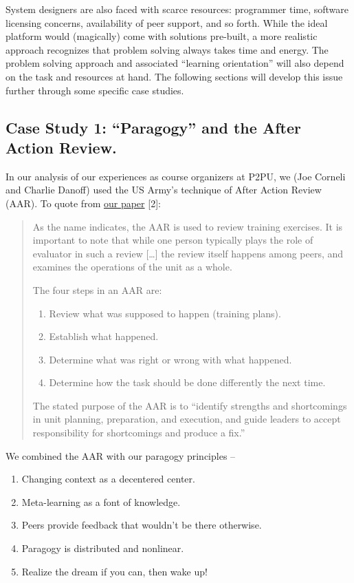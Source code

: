 System designers are also faced with scarce resources: programmer time,
software licensing concerns, availability of peer support, and so forth.
While the ideal platform would (magically) come with solutions
pre-built, a more realistic approach recognizes that problem solving
always takes time and energy. The problem solving approach and
associated ``learning orientation'' will also depend on the task and
resources at hand. The following sections will develop this issue
further through some specific case studies.

\subsection{Case Study 1: ``Paragogy'' and the After Action
Review.}\label{case-study-1-paragogy-and-the-after-action-review.}

In our analysis of our experiences as course organizers at P2PU, we (Joe
Corneli and Charlie Danoff) used the US Army's technique of After Action
Review (AAR). To quote from
\href{http://paragogy.net/ParagogyPaper2}{our paper} {{[}2{]}}:

\begin{quote}
As the name indicates, the AAR is used to review training exercises. It
is important to note that while one person typically plays the role of
evaluator in such a review {{[}\ldots{}{]}} the review itself happens
among peers, and examines the operations of the unit as a whole.

The four steps in an AAR are:

\begin{enumerate}
\def\labelenumi{\arabic{enumi}.}
\item
  Review what was supposed to happen (training plans).
\item
  Establish what happened.
\item
  Determine what was right or wrong with what happened.
\item
  Determine how the task should be done differently the next time.
\end{enumerate}

The stated purpose of the AAR is to ``identify strengths and
shortcomings in unit planning, preparation, and execution, and guide
leaders to accept responsibility for shortcomings and produce a fix.''
\end{quote}

We combined the AAR with our paragogy principles --

\begin{enumerate}
\def\labelenumi{\arabic{enumi}.}
\item
  Changing context as a decentered center.
\item
  Meta-learning as a font of knowledge.
\item
  Peers provide feedback that wouldn't be there otherwise.
\item
  Paragogy is distributed and nonlinear.
\item
  Realize the dream if you can, then wake up!
\end{enumerate}

